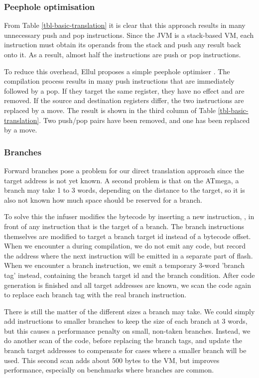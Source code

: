 \subsubsection{Peephole optimisation}
From Table \ref{tbl-basic-translation} it is clear that this approach results in many unnecessary push and pop instructions. Since the JVM is a stack-based VM, each instruction must obtain its operands from the stack and push any result back onto it. As a result, almost half the instructions are push or pop instructions.

To reduce this overhead, Ellul proposes a simple peephole optimiser \cite{Ellul:2012thesis}. The compilation process results in many push instructions that are immediately followed by a pop. If they target the same register, they have no effect and are removed. If the source and destination registers differ, the two instructions are replaced by a move. The result is shown in the third column of Table \ref{tbl-basic-translation}. Two push/pop pairs have been removed, and one has been replaced by a move.

\subsubsection{Branches}
Forward branches pose a problem for our direct translation approach since the target address is not yet known. A second problem is that on the ATmega, a branch may take 1 to 3 words, depending on the distance to the target, so it is also not known how much space should be reserved for a branch.

To solve this the infuser modifies the bytecode by inserting a new instruction, , in front of any instruction that is the target of a branch. The branch instructions themselves are modified to target a branch target id instead of a bytecode offset. When we encounter a  during compilation, we do not emit any code, but record the address where the next instruction will be emitted in a separate part of flash. When we encounter a branch instruction, we emit a temporary 3-word 'branch tag' instead, containing the branch target id and the branch condition. After code generation is finished and all target addresses are known, we scan the code again to replace each branch tag with the real branch instruction.

There is still the matter of the different sizes a branch may take. We could simply add  instructions to smaller branches to keep the size of each branch at 3 words, but this causes a performance penalty on small, non-taken branches. Instead, we do another scan of the code, before replacing the branch tags, and update the branch target addresses to compensate for cases where a smaller branch will be used. This second scan adds about 500 bytes to the VM, but improves performance, especially on benchmarks where branches are common.

